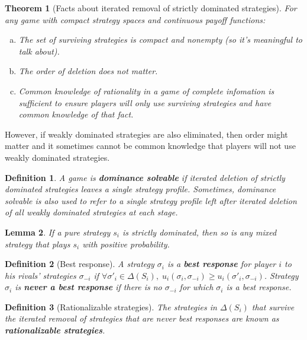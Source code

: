 \documentclass[letter, 11pt]{article}
\theoremstyle{basic}
\newtheorem{definition}{Definition}[section]
\newtheorem{theorem}{Theorem}[section]
\newtheorem{lemma}[theorem]{Lemma}
\begin{document}
\begin{spacing}{1.0}
\begin{theorem}[Facts about iterated removal of strictly dominated
  strategies]
  For any game with compact strategy spaces and continuous payoff functions:
  \begin{enumerate}[a)]\leftskip = 1em
  \item The set of surviving strategies is compact and
    nonempty (so it's meaningful to talk about).
  \item The order of deletion does not matter.
  \item Common knowledge of rationality in a game of complete infomation is
    sufficient to ensure players will only use surviving strategies and
    have common knowledge of that fact.
  \end{enumerate}
\end{theorem}

However, if weakly dominated strategies are also eliminated, then
order might matter and it sometimes cannot be common knowledge that players
will not use weakly dominated strategies.

\begin{definition}
  A game is \textbf{dominance solvable} if iterated deletion of strictly
  dominated strategies leaves a single strategy profile. Sometimes,
  dominance solvable is also used to refer to a single strategy profile
  left after iterated deletion of all weakly dominated strategies at each
  stage.
\end{definition}

\begin{lemma}
  If a pure strategy $s_i$ is strictly dominated, then so is any mixed
  strategy that plays $s_i$ with positive probability.
\end{lemma}

\begin{definition}[Best response]
  A strategy $\sigma_i$ is a \textbf{best response} for
  player $i$ to his rivals' strategies $\sigma_{-i}$ if $\forall \sigma'_i
  \in \Delta(S_i),\; u_i(\sigma_i, \sigma_{-i}) \geq u_i(\sigma'_i,
  \sigma_{-i})$. Strategy $\sigma_i$ is \textbf{never a best response} if
  there is no $\sigma_{-i}$ for which $\sigma_i$ is a best response.
\end{definition}

\begin{definition}[Rationalizable strategies]
  The strategies in $\Delta(S_i)$ that survive
  the iterated removal of strategies that are never best responses are
  known as \textbf{rationalizable strategies}.
\end{definition}


\end{spacing}
\end{document}
